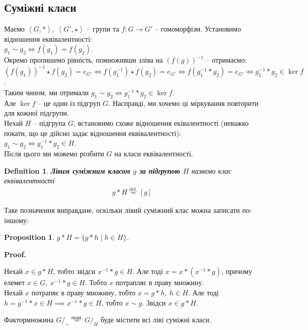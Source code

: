 \documentclass[a4paper, 10pt]{article}
\makeatletter
\theoremstyle{theoremdd}
\theoremstyle{theoremdd}
\newtheorem{definition}[theorem]{Definition}
\theoremstyle{theoremdd}
\theoremstyle{theoremdd}
\theoremstyle{theoremdd}
\theoremstyle{theoremdd}
\theoremstyle{theoremdd}
\theoremstyle{theoremdd}
\theoremstyle{theoremdd}
\newtheorem{proposition}[theorem]{Proposition}
\theoremstyle{theoremdd}
\theoremstyle{theoremdd}
\theoremstyle{theoremdd}
\theoremstyle{theoremdd}
\theoremstyle{theoremdd}
\theoremstyle{theoremdd}
\renewenvironment{proof}[1][Proof.\\]{\par
\pushQED{\hfill \qed}%
\normalfont \topsep6\p@\@plus6\p@\relax
\trivlist
\item\relax
{\bfseries
#1\@addpunct{.}}\hspace\labelsep\ignorespaces
}{%
\popQED\endtrivlist\@endpefalse
}
\newcommand{\eqbydef}{\overset{\text{def.}}{=}}
\makeatother
\begin{document}
\subsection{Суміжні класи}
Маємо $\left< G, *\right>,\ \left< G', \star \right>$ -- групи та $f \colon G \to G'$ -- гомоморфізм. Установимо відношення еквівалентності:\\
$g_1 \sim g_2 \iff f(g_1) = f(g_2)$.\\
Окремо пропишемо рівність, помноживши зліва на $(f(g))^{-1}$ -- отримаємо:\\
$(f(g_1))^{-1} \star f(g_2) = e_{G'} \iff f(g_1^{-1}) \star f(g_2) = e_{G'} \iff f(g_1^{-1}*g_2) = e_{G'} \iff g_1^{-1}*g_2 \in \ker f$.\\
Таким чином, ми отримали $g_1 \sim g_2 \iff g_1^{-1}*g_2 \in \ker f$.\\
Але $\ker f$ -- це один із підгруп $G$. Насправді, ми хочемо ці міркування повторити для кожної підгрупи.
\bigskip \\
Нехай $H$ -- підгрупа $G$, встановимо схоже відношення еківалентності (неважко покати, що це дійсно задає відношення еквівалентності):\\
$g_1 \sim g_2 \iff g_1^{-1}*g_2 \in H$.\\
Після цього ми можемо розбити $G$ на класи еквівалентності.

\begin{definition}
\textbf{Лівим суміжним класом $g$ за підгрупою $H$} назвемо клас еквівалентності
\begin{align*}
g*H \eqbydef [g]
\end{align*}
\end{definition}

Таке позначення виправдане, оскільки лівий суміжний клас можна записати по-іншому:

\begin{proposition}
$g*H = \{ g*h \mid h \in H \}$.
\end{proposition}

\begin{proof}
Нехай $x \in g*H$, тобто звідси $x^{-1}*g \in H$. Але тоді $x = x*(x^{-1}*g)$, причому елемет $x \in G,\ x^{-1}*g \in H$. Тобто $x$ потрапляє в праву множину.\\
Нехай $x$ потрапяє в праву множину, тобто $x = g*h,\ h \in H$. Але тоді $h = g^{-1}*x \in H \implies x^{-1}*g \in H$, тобто $x \sim g$. Звідси $x \in g*H$.
\end{proof}

Фактормножина $G/_{\sim} \overset{\text{позн.}}{=} G/_H$ буде містити всі ліві суміжні класи.
\end{document}

